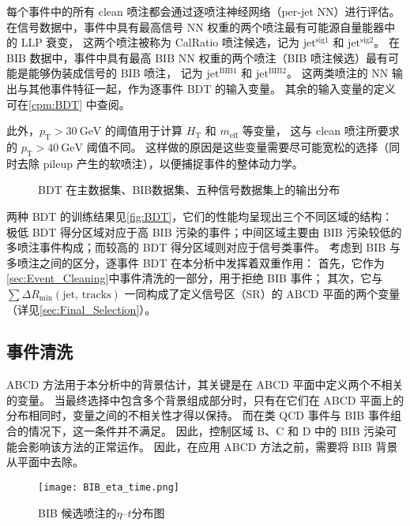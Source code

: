每个事件中的所有 clean 喷注都会通过逐喷注神经网络（per-jet NN）进行评估。
在信号数据中，事件中具有最高信号 NN 权重的两个喷注最有可能源自量能器中的 LLP 衰变，
这两个喷注被称为 CalRatio 喷注候选，记为 $\text{jet}^{\text{sig1}}$ 和 $\text{jet}^{\text{sig2}}$。
在 BIB 数据中，事件中具有最高 BIB NN 权重的两个喷注（BIB 喷注候选）最有可能是能够伪装成信号的 BIB 喷注，
记为 $\text{jet}^{\text{BIB}1}$ 和 $\text{jet}^{\text{BIB}2}$。
这两类喷注的 NN 输出与其他事件特征一起，作为逐事件 BDT 的输入变量。
其余的输入变量的定义可在\autoref{cpm:BDT} 中查阅。

此外，$p_\mathrm{T} > 30~\text{GeV}$ 的阈值用于计算 $H_\mathrm{T}$ 和 $m_\mathrm{eff}$ 等变量，
这与 clean 喷注所要求的 $p_\mathrm{T} > 40~\text{GeV}$ 阈值不同。
这样做的原因是这些变量需要尽可能宽松的选择（同时去除 pileup 产生的软喷注），以便捕捉事件的整体动力学。

\begin{figure}[ht]
    \centering
    \hfill
    \caption{BDT 在主数据集、BIB数据集、五种信号数据集上的输出分布}
    \label{fig:BDT}
\end{figure}

两种 BDT 的训练结果见\autoref{fig:BDT}，它们的性能均呈现出三个不同区域的结构：
极低 BDT 得分区域对应于高 BIB 污染的事件；中间区域主要由 BIB 污染较低的多喷注事件构成；而较高的 BDT 得分区域则对应于信号类事件。
考虑到 BIB 与多喷注之间的区分，逐事件 BDT 在本分析中发挥着双重作用：
首先，它作为\autoref{sec:Event_Cleaning}中事件清洗的一部分，用于拒绝 BIB 事件；
其次，它与 $\sum \Delta R_\mathrm{min}(\text{jet, tracks})$ 一同构成了定义信号区（SR）的 ABCD 平面的两个变量（详见\autoref{sec:Final_Selection}）。


\subsection{事件清洗}
\label{sec:Event_Cleaning}

ABCD 方法用于本分析中的背景估计，其关键是在 ABCD 平面中定义两个不相关的变量。
当最终选择中包含多个背景组成部分时，只有在它们在 ABCD 平面上的分布相同时，变量之间的不相关性才得以保持。
而在类 QCD 事件与 BIB 事件组合的情况下，这一条件并不满足。
因此，控制区域 B、C 和 D 中的 BIB 污染可能会影响该方法的正常运作。
因此，在应用 ABCD 方法之前，需要将 BIB 背景从平面中去除。

\begin{figure}[ht]
    \centering
    \texttt{[image: BIB\_eta\_time.png]}
    \caption{BIB 候选喷注的$\eta$--$t$分布图}
    \label{fig:BIB_eta_time}
\end{figure}

